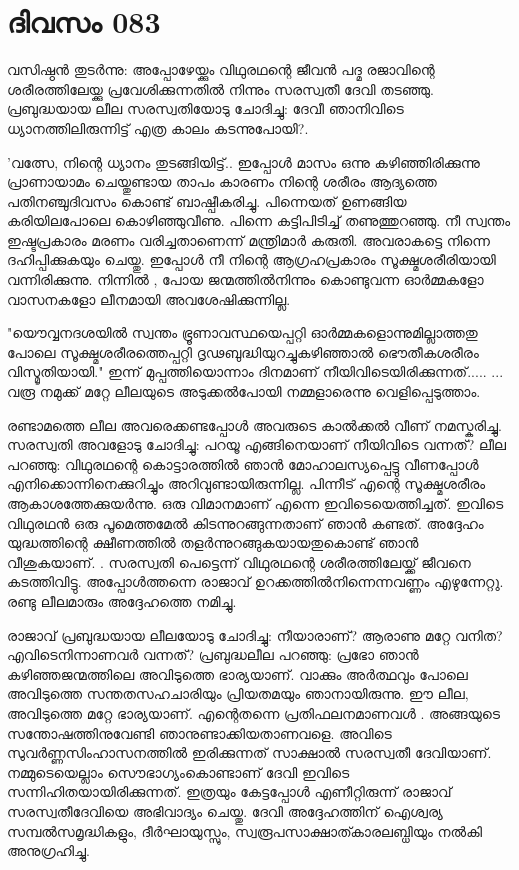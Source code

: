  
\section{ദിവസം 083}


വസിഷ്ഠന്‍ തുടര്‍ന്നു: അപ്പോഴേയ്ക്കും വിഥുരഥന്റെ ജീവന്‍ പദ്മ രജാവിന്റെ ശരീരത്തിലേയ്ക്കു പ്രവേശിക്കുന്നതില്‍ നിന്നും സരസ്വതീ ദേവി തടഞ്ഞു. പ്രബുദ്ധയായ ലീല സരസ്വതിയോടു ചോദിച്ചു: ദേവീ ഞാനിവിടെ ധ്യാനത്തിലിരുന്നിട്ട്‌ എത്ര കാലം കടന്നുപോയി?.

'വത്സേ, നിന്റെ ധ്യാനം തുടങ്ങിയിട്ട്‌.. ഇപ്പോള്‍ മാസം ഒന്നു കഴിഞ്ഞിരിക്കുന്നു  പ്രാണായാമം ചെയ്തുണ്ടായ താപം കാരണം നിന്റെ ശരീരം ആദ്യത്തെ പതിനഞ്ചുദിവസം കൊണ്ട്‌ ബാഷ്പീകരിച്ചു. പിന്നെയത്‌ ഉണങ്ങിയ കരിയിലപോലെ കൊഴിഞ്ഞുവീണു. പിന്നെ കട്ടിപിടിച്ച്‌ തണുത്തുറഞ്ഞു. നീ സ്വന്തം ഇഷ്ടപ്രകാരം മരണം വരിച്ചതാണെന്ന് മന്ത്രിമാര്‍ കരുതി. അവരാകട്ടെ നിന്നെ ദഹിപ്പിക്കുകയും ചെയ്തു. ഇപ്പോള്‍ നീ നിന്റെ ആഗ്രഹപ്രകാരം സൂക്ഷ്മശരീരിയായി വന്നിരിക്കുന്നു. നിന്നില്‍ , പോയ ജന്മത്തില്‍നിന്നും കൊണ്ടുവന്ന ഓര്‍മ്മകളോ വാസനകളോ ലീനമായി അവശേഷിക്കുന്നില്ല.

"യൌവ്വനദശയില്‍ സ്വന്തം ഭ്രൂണാവസ്ഥയെപ്പറ്റി ഓര്‍മ്മകളൊന്നുമില്ലാത്തതു പോലെ സൂക്ഷ്മശരീരത്തെപ്പറ്റി ദൃഢബുദ്ധിയുറച്ചുകഴിഞ്ഞാല്‍ ഭൌതീകശരീരം വിസ്മൃതിയായി." ഇന്ന് മുപ്പത്തിയൊന്നാം ദിനമാണ്‌ നീയിവിടെയിരിക്കുന്നത്‌.....  ... വരൂ നമുക്ക്‌ മറ്റേ ലീലയുടെ അടുക്കല്‍പോയി നമ്മളാരെന്നു വെളിപ്പെടുത്താം. 

രണ്ടാമത്തെ ലീല അവരെക്കണ്ടപ്പോള്‍ അവരുടെ കാല്‍ക്കല്‍ വീണ്‌ നമസ്കരിച്ചു. സരസ്വതി അവളോടു ചോദിച്ചു: പറയൂ എങ്ങിനെയാണ്‌ നീയിവിടെ വന്നത്‌? ലീല പറഞ്ഞു: വിഥുരഥന്റെ കൊട്ടാരത്തില്‍ ഞാന്‍ മോഹാലസ്യപ്പെട്ടു വീണപ്പോള്‍ എനിക്കൊന്നിനെക്കുറിച്ചും അറിവുണ്ടായിരുന്നില്ല. പിന്നീട്‌ എന്റെ സൂക്ഷ്മശരീരം ആകാശത്തേക്കുയര്‍ന്നു. ഒരു വിമാനമാണ്‌ എന്നെ ഇവിടെയെത്തിച്ചത്‌. ഇവിടെ വിഥുരഥന്‍ ഒരു പൂമെത്തമേല്‍ കിടന്നുറങ്ങുന്നതാണ്‌ ഞാന്‍ കണ്ടത്‌. അദ്ദേഹം യുദ്ധത്തിന്റെ ക്ഷീണത്തില്‍ തളര്‍ന്നുറങ്ങുകയായതുകൊണ്ട്‌ ഞാന്‍ വീശുകയാണ്‌. . സരസ്വതി പെട്ടെന്ന് വിഥുരഥന്റെ ശരീരത്തിലേയ്ക്ക്‌ ജീവനെ കടത്തിവിട്ടു. അപ്പോള്‍ത്തന്നെ രാജാവ്‌ ഉറക്കത്തില്‍നിന്നെന്നവണ്ണം എഴുന്നേറ്റു. രണ്ടു ലീലമാരും അദ്ദേഹത്തെ നമിച്ചു.

രാജാവ്‌ പ്രബുദ്ധയായ ലീലയോടു ചോദിച്ചു: നീയാരാണ്‌? ആരാണു മറ്റേ വനിത?എവിടെനിന്നാണവര്‍ വന്നത്‌? പ്രബുദ്ധലീല പറഞ്ഞു: പ്രഭോ ഞാന്‍ കഴിഞ്ഞജന്മത്തിലെ അവിടുത്തെ ഭാര്യയാണ്‌. വാക്കും അര്‍ത്ഥവും പോലെ അവിടുത്തെ സന്തതസഹചാരിയും പ്രിയതമയും ഞാനായിരുന്നു. ഈ ലീല, അവിടുത്തെ മറ്റേ ഭാര്യയാണ്‌. എന്റെതന്നെ പ്രതിഫലനമാണവള്‍ .  അങ്ങയുടെ സന്തോഷത്തിനുവേണ്ടി ഞാനുണ്ടാക്കിയതാണവളെ. അവിടെ സുവര്‍ണ്ണസിംഹാസനത്തില്‍ ഇരിക്കുന്നത്‌ സാക്ഷാല്‍ സരസ്വതീ ദേവിയാണ്‌. നമ്മുടെയെല്ലാം സൌഭാഗ്യംകൊണ്ടാണ്‌ ദേവി ഇവിടെ സന്നിഹിതയായിരിക്കുന്നത്‌. ഇത്രയും കേട്ടപ്പോള്‍ എണീറ്റിരുന്ന് രാജാവ്‌ സരസ്വതീദേവിയെ അഭിവാദ്യം ചെയ്തു. ദേവി അദ്ദേഹത്തിന്‌ ഐശ്വര്യ സമ്പല്‍സമൃദ്ധികളും, ദീര്‍ഘായുസ്സും, സ്വരൂപസാക്ഷാത്കാരലബ്ധിയും നല്‍കി അനുഗ്രഹിച്ചു.

